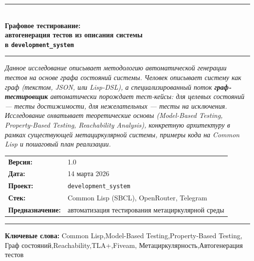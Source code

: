 \documentclass[12pt, a4paper, twoside]{article}
\begin{document}
\begin{titlepage}
  \color{DarkGray}

  \vspace*{10mm}

  {\color{AccentBlue}\rule{\textwidth}{1.5pt}}
  \vspace{6mm}

  {\sffamily\small\color{MidGray}{ТЕХНИЧЕСКОЕ ИССЛЕДОВАНИЕ}}\\[4mm]

  {\sffamily\LARGE\bfseries\color{AccentBlue}
    Графовое тестирование:\\[4pt]
    автогенерация тестов из описания системы\\[4pt]
    в \texttt{development\_system}
  }

  \vspace{8mm}
  {\color{AccentBlue}\rule{\textwidth}{0.4pt}}
  \vspace{8mm}

  \begin{minipage}{0.92\textwidth}
    \itshape\color{DarkGray}
    Данное исследование описывает методологию автоматической генерации
    тестов на основе графа состояний системы. Человек описывает систему
    как граф (текстом, JSON, или Lisp-DSL), а специализированный поток
    \textbf{граф-тестировщик} автоматически порождает тест-кейсы:
    для целевых состояний --- тесты достижимости, для нежелательных ---
    тесты на исключения. Исследование охватывает теоретические основы
    (Model-Based Testing, Property-Based Testing, Reachability Analysis),
    конкретную архитектуру в рамках существующей метациркулярной системы,
    примеры кода на Common Lisp и пошаговый план реализации.
  \end{minipage}

  \vspace{12mm}

  \begin{tabular}{ll}
    \textbf{Версия:}  & 1.0 \\[2pt]
    \textbf{Дата:}    & 14 марта 2026 \\[2pt]
    \textbf{Проект:}  & \texttt{development\_system} \\[2pt]
    \textbf{Стек:}    & Common Lisp (SBCL), OpenRouter, Telegram \\[2pt]
    \textbf{Предназначение:} & автоматизация тестирования метациркулярной среды \\
  \end{tabular}

  \vfill

  {\color{AccentBlue}\rule{\textwidth}{0.4pt}}
  \vspace{4mm}
  {\small\color{MidGray}
    \textbf{Ключевые слова:}
    Common Lisp,\enspace Model-Based Testing,\enspace Property-Based Testing,\enspace
    Граф состояний,\enspace Reachability,\enspace TLA+,\enspace Fiveam,\enspace
    Метациркулярность,\enspace Автогенерация тестов
  }

  \restoregeometry
\end{titlepage}
\end{document}
